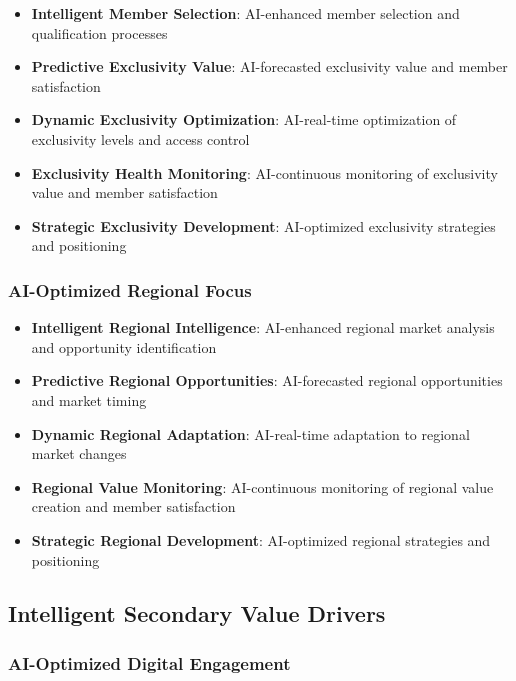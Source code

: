 \begin{itemize}
    \item \textbf{Intelligent Member Selection}: AI-enhanced member selection and qualification processes
    \item \textbf{Predictive Exclusivity Value}: AI-forecasted exclusivity value and member satisfaction
    \item \textbf{Dynamic Exclusivity Optimization}: AI-real-time optimization of exclusivity levels and access control
    \item \textbf{Exclusivity Health Monitoring}: AI-continuous monitoring of exclusivity value and member satisfaction
    \item \textbf{Strategic Exclusivity Development}: AI-optimized exclusivity strategies and positioning
\end{itemize}

\subsubsection{AI-Optimized Regional Focus}

\begin{itemize}
    \item \textbf{Intelligent Regional Intelligence}: AI-enhanced regional market analysis and opportunity identification
    \item \textbf{Predictive Regional Opportunities}: AI-forecasted regional opportunities and market timing
    \item \textbf{Dynamic Regional Adaptation}: AI-real-time adaptation to regional market changes
    \item \textbf{Regional Value Monitoring}: AI-continuous monitoring of regional value creation and member satisfaction
    \item \textbf{Strategic Regional Development}: AI-optimized regional strategies and positioning
\end{itemize}

\subsection{Intelligent Secondary Value Drivers}

\subsubsection{AI-Optimized Digital Engagement}


